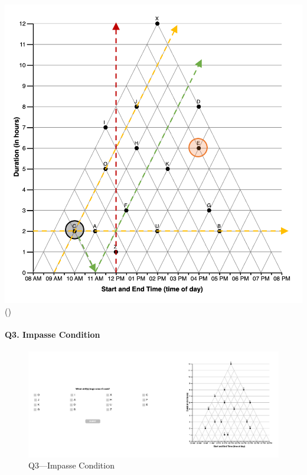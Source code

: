 \documentclass[
  letterpaper,
  DIV=11,
  numbers=noendperiod]{scrreprt}
\let\oldparagraph\paragraph
\renewcommand{\paragraph}[1]{\oldparagraph{#1}\mbox{}}
\begin{document}
\begin{longtable}[]
\includegraphics{analysis/SGC3A/static/interpretations/Q3_111_E.png} \\
\bottomrule()
\end{longtable}

\hypertarget{q3.-impasse-condition}{%
\paragraph{Q3. Impasse Condition}\label{q3.-impasse-condition}}

\begin{figure}

{\centering \includegraphics{analysis/SGC3A/static/questions/Q3_121.png}

}

\caption{\label{fig-Q3-121}Q3---Impasse Condition}

\end{figure}
\end{document}
